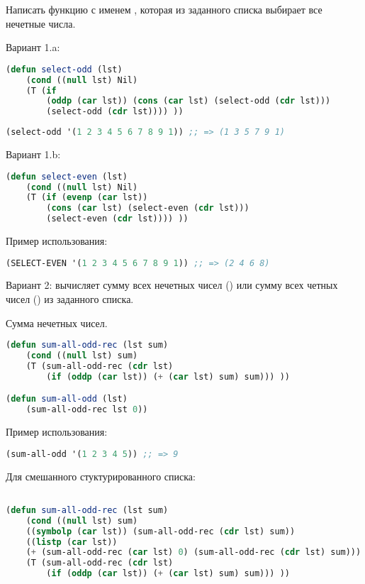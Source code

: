 \documentclass[a4paper,oneside,12pt]{extreport}
\begin{document}
\begin{task}
	Написать функцию с именем , 
    которая из заданного списка выбирает все нечетные числа.
	
    Вариант 1.a: 

    \begin{lstlisting}[language=Lisp]
(defun select-odd (lst) 
    (cond ((null lst) Nil)
    (T (if 
        (oddp (car lst)) (cons (car lst) (select-odd (cdr lst)))
        (select-odd (cdr lst)))) ))
    \end{lstlisting}

    \begin{lstlisting}[language=Lisp] 
(select-odd '(1 2 3 4 5 6 7 8 9 1)) ;; => (1 3 5 7 9 1)
    \end{lstlisting}

    Вариант 1.b: 

    \begin{lstlisting}[language=Lisp] 
(defun select-even (lst) 
    (cond ((null lst) Nil)
    (T (if (evenp (car lst)) 
        (cons (car lst) (select-even (cdr lst)))
        (select-even (cdr lst)))) ))    
    \end{lstlisting}

    Пример использования:
    \begin{lstlisting}[language=Lisp] 
(SELECT-EVEN '(1 2 3 4 5 6 7 8 9 1)) ;; => (2 4 6 8)
    \end{lstlisting}

    Вариант 2: вычисляет сумму всех нечетных чисел () 
    или сумму всех четных чисел () из заданного списка.

    Сумма нечетных чисел.
    \begin{lstlisting}[language=Lisp]
(defun sum-all-odd-rec (lst sum) 
	(cond ((null lst) sum) 
	(T (sum-all-odd-rec (cdr lst) 
		(if (oddp (car lst)) (+ (car lst) sum) sum))) ))

(defun sum-all-odd (lst)
	(sum-all-odd-rec lst 0))
    \end{lstlisting}

    Пример использования:
    \begin{lstlisting}[language=Lisp] 
(sum-all-odd '(1 2 3 4 5)) ;; => 9
    \end{lstlisting}


    Для смешанного стуктурированного списка:
    \begin{lstlisting}[language=Lisp] 

(defun sum-all-odd-rec (lst sum) 
    (cond ((null lst) sum) 
    ((symbolp (car lst)) (sum-all-odd-rec (cdr lst) sum))
    ((listp (car lst)) 
    (+ (sum-all-odd-rec (car lst) 0) (sum-all-odd-rec (cdr lst) sum)))
    (T (sum-all-odd-rec (cdr lst) 
        (if (oddp (car lst)) (+ (car lst) sum) sum))) ))


\end{lstlisting}
\end{task}
\end{document}
